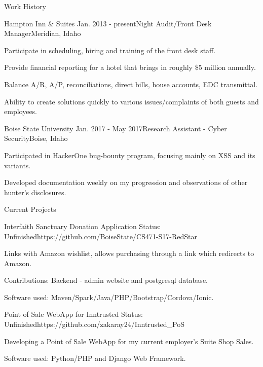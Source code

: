 \documentclass{resume}
\begin{document}
\begin{rSection}{Work History}

\begin{rSubsection}{Hampton Inn \& Suites}
{Jan. 2013 - present}{Night Audit/Front Desk Manager}{Meridian, Idaho}
\item Participate in scheduling, hiring and training of the front desk staff. 
\item Provide financial reporting for a hotel that brings in roughly \$5 million annually.
\item Balance A/R, A/P, reconciliations, direct bills, house accounts, EDC transmittal.
\item Ability to create solutions quickly to various issues/complaints of both guests and employees. 
\end{rSubsection}

\begin{rSubsection}{Boise State University}
{Jan. 2017 - May 2017}{Research Assistant - Cyber Security}{Boise, Idaho}
\item Participated in HackerOne bug-bounty program, focusing mainly on XSS and its variants.
\item Developed documentation weekly on my progression and observations of other hunter's disclosures.
\end{rSubsection}  

\end{rSection}

\begin{rSection}{Current Projects}

\begin{rSubsection}{Interfaith Sanctuary Donation Application}
{Status: Unfinished}{https://github.com/BoiseState/CS471-S17-RedStar}{}
\item Links with Amazon wishlist, allows purchasing through a link which redirects to Amazon.
\item Contributions: Backend - admin website and postgresql database.
\item Software used: Maven/Spark/Java/PHP/Bootstrap/Cordova/Ionic.
\end{rSubsection}

\begin{rSubsection}{Point of Sale WebApp for Inntrusted}
{Status: Unfinished}{https://github.com/zakaray24/Inntrusted\_PoS}{}
\item Developing a Point of Sale WebApp for my current employer's Suite Shop Sales.
\item Software used: Python/PHP and Django Web Framework.
\end{rSubsection}

\end{rSection}
\end{document}

